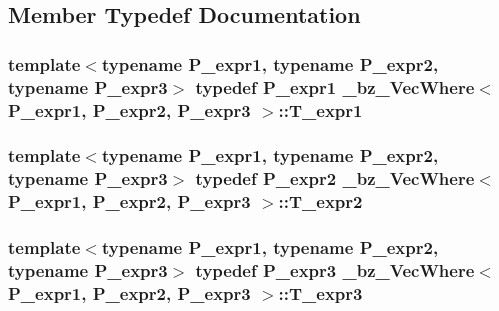 \subsection{Member Typedef Documentation}
\hypertarget{class__bz__VecWhere_a1be44d6fc5a189edccb63d669a39d911}{}
\subsubsection[{T\+\_\+expr1}]{\setlength{\rightskip}{0pt plus 5cm}template$<$typename P\+\_\+expr1, typename P\+\_\+expr2, typename P\+\_\+expr3$>$ typedef P\+\_\+expr1 {\bf \+\_\+bz\+\_\+\+Vec\+Where}$<$ P\+\_\+expr1, P\+\_\+expr2, P\+\_\+expr3 $>$\+::{\bf T\+\_\+expr1}}\label{class__bz__VecWhere_a1be44d6fc5a189edccb63d669a39d911}
\hypertarget{class__bz__VecWhere_af11819044d65ec1172e5f5bff5925dea}{}
\subsubsection[{T\+\_\+expr2}]{\setlength{\rightskip}{0pt plus 5cm}template$<$typename P\+\_\+expr1, typename P\+\_\+expr2, typename P\+\_\+expr3$>$ typedef P\+\_\+expr2 {\bf \+\_\+bz\+\_\+\+Vec\+Where}$<$ P\+\_\+expr1, P\+\_\+expr2, P\+\_\+expr3 $>$\+::{\bf T\+\_\+expr2}}\label{class__bz__VecWhere_af11819044d65ec1172e5f5bff5925dea}
\hypertarget{class__bz__VecWhere_add1351585098ebec2a48f1b6fbe18761}{}
\subsubsection[{T\+\_\+expr3}]{\setlength{\rightskip}{0pt plus 5cm}template$<$typename P\+\_\+expr1, typename P\+\_\+expr2, typename P\+\_\+expr3$>$ typedef P\+\_\+expr3 {\bf \+\_\+bz\+\_\+\+Vec\+Where}$<$ P\+\_\+expr1, P\+\_\+expr2, P\+\_\+expr3 $>$\+::{\bf T\+\_\+expr3}}\label{class__bz__VecWhere_add1351585098ebec2a48f1b6fbe18761}
\hypertarget{class__bz__VecWhere_a82e31f20b77e9657a8cb8ab4d20e9ba7}{}
